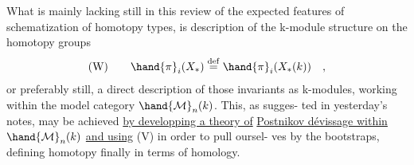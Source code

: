 What is mainly lacking still in this review of the  expected 
features of schematization of homotopy types, is description of the
k-module structure on the homotopy groups
\[ \text{(W)} \qquad \hand{\pi}_i(X_*) \overset{\mathrm{def}}{=} \hand{\pi}_i(X_*(k)) \quad , \]
or preferably still, a direct description of those invariants as
k-modules, working within the model category $\hand{\mathcal{M}}_n(k)$.  This, as sugges-%
ted in yesterday's notes, may be achieved \uline{by developping a theory of}
\uline{Postnikov dévissage within} $\hand{\mathcal{M}}_n(k)$ \uline{and using} (V) in order to pull oursel-%
ves by the bootstraps, defining homotopy finally in terms of homology.


